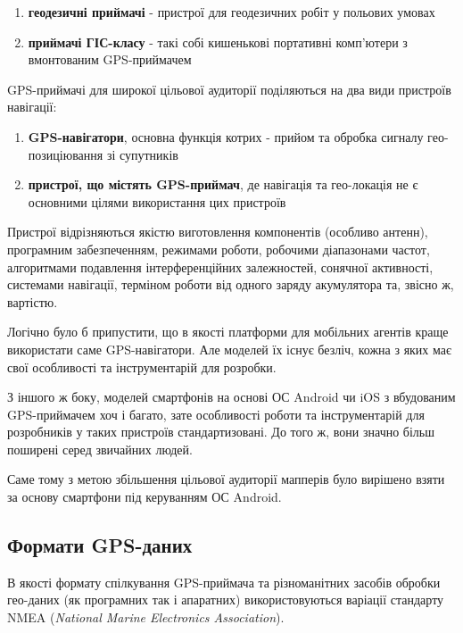 \documentclass[simple,a4paper,14pt,ukrainian,utf8]{eskdtext}
\begin{document}
    \begin{enumerate}
    	\item \textbf{геодезичні приймачі} - пристрої для геодезичних робіт у польових умовах
    	\item \textbf{приймачі ГІС-класу} - такі собі кишенькові портативні комп’ютери з вмонтованим GPS-приймачем
    \end{enumerate}
    
    GPS-приймачі для широкої цільової аудиторії поділяються на два види пристроїв навігації:
    
    \begin{enumerate}
    	\item \textbf{GPS-навігатори}, основна функція котрих - прийом та обробка сигналу гео-позиціювання зі супутників
    	\item \textbf{пристрої, що містять GPS-приймач}, де навігація та гео-локація не є основними цілями використання цих пристроїв
    \end{enumerate}
    
    Пристрої відрізняються якістю виготовлення компонентів (особливо антенн), програмним забезпеченням, режимами роботи, робочими діапазонами частот, алгоритмами подавлення інтерференційних залежностей, сонячної активності, системами навігації, терміном роботи від одного заряду акумулятора та, звісно ж, вартістю.

    Логічно було б припустити, що в якості платформи для мобільних агентів краще використати саме GPS-навігатори. Але моделей їх існує безліч, кожна з яких має свої особливості та інструментарій для розробки. 
    
    З іншого ж боку, моделей смартфонів на основі ОС Android чи iOS з вбудованим GPS-приймачем хоч і багато, зате особливості роботи та інструментарій для розробників у таких пристроїв стандартизовані. До того ж, вони значно більш поширені серед звичайних людей.
    
    Саме тому з метою збільшення цільової аудиторії мапперів було вирішено взяти за основу смартфони під керуванням ОС Android.

    \subsection{Формати GPS-даних}
    
    В якості формату спілкування GPS-приймача та різноманітних засобів обробки гео-даних (як програмних так і апаратних) використовуються варіації стандарту NMEA (\textit{National Marine Electronics Association}).
    
\end{document}
